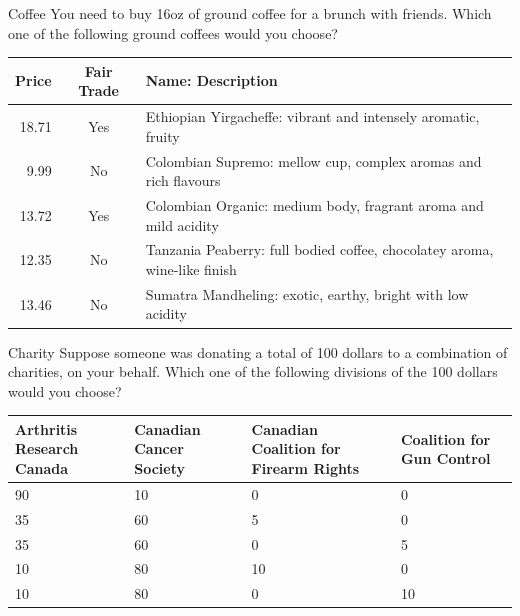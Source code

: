 \documentclass{beamer}
\begin{document}
\begin{frame}{Coffee}
You need to buy 16oz of ground coffee for a brunch with friends.
Which one of the following ground coffees would you choose?

\vspace{0.5cm}
\begin{scriptsize}
\begin{center}
\begin{tabular}{rcl}
\hline
Price & Fair Trade & Name: Description \\
\hline
18.71 & Yes & Ethiopian Yirgacheffe: vibrant and intensely aromatic, fruity \\
9.99 & No & Colombian Supremo: mellow cup, complex aromas and rich flavours \\
13.72 & Yes & Colombian Organic: medium body, fragrant aroma and mild acidity \\
12.35 & No & Tanzania Peaberry: full bodied coffee, chocolatey aroma, wine-like finish \\
13.46 & No & Sumatra Mandheling: exotic, earthy, bright with low acidity \\
\hline
\end{tabular}
\end{center}
\end{scriptsize}
\end{frame}

\begin{frame}{Charity}
Suppose someone was donating a total of 100 dollars to a combination of charities,
on your behalf.
Which one of the following divisions of the 100 dollars would you choose?

\vspace{0.5cm}
\begin{center}
\begin{tabular}{p{25mm}|p{25mm}|p{25mm}|p{25mm}}
\hline
Arthritis Research Canada &
Canadian Cancer Society &
Canadian Coalition for Firearm Rights &
Coalition for Gun Control \\
\hline
90 & 10 & 0 & 0 \\
35 & 60 & 5 & 0 \\
35 & 60 & 0 & 5 \\
10 & 80 & 10 & 0 \\
10 & 80 & 0 & 10 \\
\hline
\end{tabular}
\end{center}
\end{frame}
\end{document}
